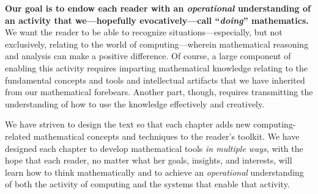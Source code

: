 \bigskip

{\bf Our goal is to endow each reader with an {\em operational} understanding of an activity that we---hopefully evocatively---call ``{\em doing}'' mathematics.}  We want the reader to be able to recognize situations---especially, but not exclusively, relating to the world of computing---wherein mathematical reasoning and analysis can make a positive difference.  Of course, a large component of enabling this activity requires imparting  mathematical knowledge relating to the fundamental concepts and tools and intellectual artifacts that we have inherited from our mathematical forebears.  Another part, though, requires transmitting the understanding of how to use the knowledge effectively and creatively.

\smallskip

We have striven to design the text so that each chapter adds new computing-related mathematical concepts and techniques to the reader's toolkit.  We have designed each chapter to develop mathematical tools {\em in multiple ways}, with the hope that each reader, no matter what her goals, insights, and interests, will learn how to think mathematically and to achieve an {\em operational} understanding of both the activity of computing and the systems that enable that activity.

\smallskip

